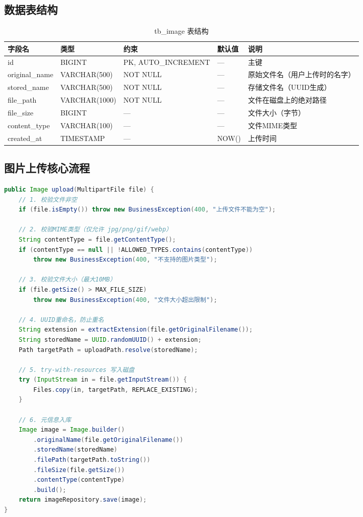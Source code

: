\documentclass{../softeng}
\begin{document}
\subsection{数据表结构}

\begin{table}[htbp]
\centering
\caption{tb\_image 表结构}
\label{tab:tb_image}
\begin{tabular}{lllll}
\toprule
\textbf{字段名} & \textbf{类型} & \textbf{约束} & \textbf{默认值} & \textbf{说明} \\
\midrule
id            & BIGINT    & PK, AUTO\_INCREMENT & —      & 主键 \\
original\_name & VARCHAR(500) & NOT NULL        & —      & 原始文件名（用户上传时的名字）\\
stored\_name   & VARCHAR(500) & NOT NULL        & —      & 存储文件名（UUID生成）\\
file\_path     & VARCHAR(1000)& NOT NULL        & —      & 文件在磁盘上的绝对路径 \\
file\_size     & BIGINT    & —                & —      & 文件大小（字节）\\
content\_type  & VARCHAR(100) & —                & —      & 文件MIME类型 \\
created\_at    & TIMESTAMP & —                & NOW()  & 上传时间 \\
\bottomrule
\end{tabular}
\end{table}

\subsection{图片上传核心流程}

\begin{lstlisting}[language=Java,caption={ImageService.upload() 核心流程}]
public Image upload(MultipartFile file) {
    // 1. 校验文件非空
    if (file.isEmpty()) throw new BusinessException(400, "上传文件不能为空");

    // 2. 校验MIME类型（仅允许 jpg/png/gif/webp）
    String contentType = file.getContentType();
    if (contentType == null || !ALLOWED_TYPES.contains(contentType))
        throw new BusinessException(400, "不支持的图片类型");

    // 3. 校验文件大小（最大10MB）
    if (file.getSize() > MAX_FILE_SIZE)
        throw new BusinessException(400, "文件大小超出限制");

    // 4. UUID重命名，防止重名
    String extension = extractExtension(file.getOriginalFilename());
    String storedName = UUID.randomUUID() + extension;
    Path targetPath = uploadPath.resolve(storedName);

    // 5. try-with-resources 写入磁盘
    try (InputStream in = file.getInputStream()) {
        Files.copy(in, targetPath, REPLACE_EXISTING);
    }

    // 6. 元信息入库
    Image image = Image.builder()
        .originalName(file.getOriginalFilename())
        .storedName(storedName)
        .filePath(targetPath.toString())
        .fileSize(file.getSize())
        .contentType(contentType)
        .build();
    return imageRepository.save(image);
}
\end{lstlisting}
\end{document}
